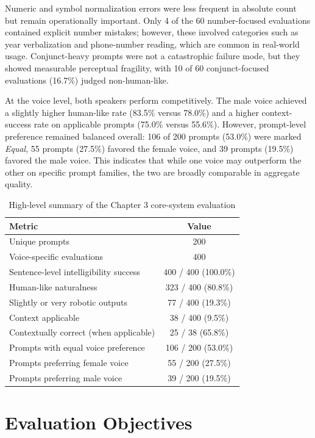 Numeric and symbol normalization errors were less frequent in absolute count but remain operationally important. Only 4 of the 60 number-focused evaluations contained explicit number mistakes; however, these involved categories such as year verbalization and phone-number reading, which are common in real-world usage. Conjunct-heavy prompts were not a catastrophic failure mode, but they showed measurable perceptual fragility, with 10 of 60 conjunct-focused evaluations (16.7\%) judged non-human-like.

At the voice level, both speakers perform competitively. The male voice achieved a slightly higher human-like rate (83.5\% versus 78.0\%) and a higher context-success rate on applicable prompts (75.0\% versus 55.6\%). However, prompt-level preference remained balanced overall: 106 of 200 prompts (53.0\%) were marked \textit{Equal}, 55 prompts (27.5\%) favored the female voice, and 39 prompts (19.5\%) favored the male voice. This indicates that while one voice may outperform the other on specific prompt families, the two are broadly comparable in aggregate quality.

\begin{table}[htbp]
\centering
\begin{tabular}{l c}
\toprule
Metric & Value \\
\midrule
Unique prompts & 200 \\
Voice-specific evaluations & 400 \\
Sentence-level intelligibility success & 400 / 400 (100.0\%) \\
Human-like naturalness & 323 / 400 (80.8\%) \\
Slightly or very robotic outputs & 77 / 400 (19.3\%) \\
Context applicable & 38 / 400 (9.5\%) \\
Contextually correct (when applicable) & 25 / 38 (65.8\%) \\
Prompts with equal voice preference & 106 / 200 (53.0\%) \\
Prompts preferring female voice & 55 / 200 (27.5\%) \\
Prompts preferring male voice & 39 / 200 (19.5\%) \\
\bottomrule
\end{tabular}
\caption{High-level summary of the Chapter 3 core-system evaluation}
\label{tab:core_system_summary}
\end{table}

\section{Evaluation Objectives}

